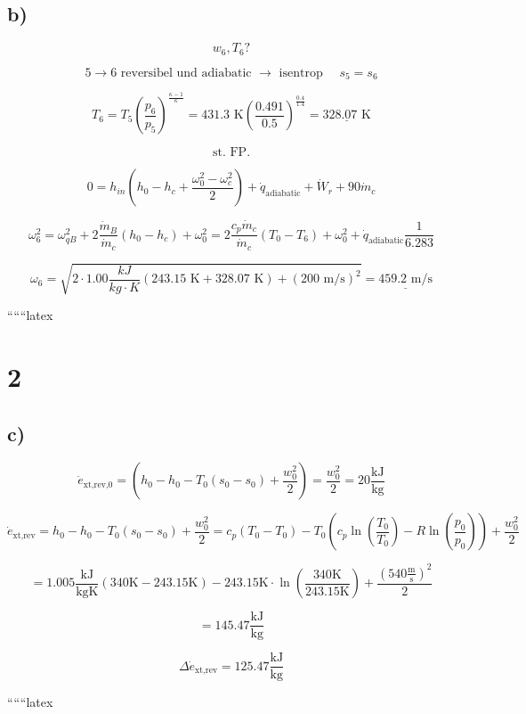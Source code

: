 \subsection*{b)}

\[
w_6, T_6 ?
\]

\[
5 \rightarrow 6 \text{ reversibel und adiabatic } \rightarrow \text{ isentrop } \quad s_5 = s_6
\]

\[
T_6 = T_5 \left( \frac{p_6}{p_5} \right)^{\frac{\kappa - 1}{\kappa}} = 431.3 \text{ K} \left( \frac{0.491}{0.5} \right)^{\frac{0.4}{1.4}} = \underline{328.07 \text{ K}}
\]

\[
\text{st. FP.}
\]

\[
0 = h_{in} \left( h_0 - h_c + \frac{\omega_0^2 - \omega_c^2}{2} \right) + \dot{q}_{\text{adiabatic}} + \dot{W}_r + 90 \dot{m}_c
\]

\[
\omega_6^2 = \omega_{qB}^2 + 2 \frac{\dot{m}_B}{\dot{m}_c} (h_0 - h_c) + \omega_0^2 = 2 \frac{c_p \dot{m}_c}{\dot{m}_c} (T_0 - T_6) + \omega_0^2 + \dot{q}_{\text{adiabatic}} \frac{1}{6.283}
\]

\[
\omega_6 = \sqrt{2 \cdot 1.00 \frac{kJ}{kg \cdot K} (243.15 \text{ K} + 328.07 \text{ K}) + (200 \text{ m/s})^2} = \underline{459.2 \text{ m/s}}
\]

``````latex

\section*{2}
\subsection*{c)}

\[
\dot{e}_{\text{xt,rev,0}} = (h_0 - h_0 - T_0 (s_0 - s_0) + \frac{w_0^2}{2}) = \frac{w_0^2}{2} = 20 \frac{\text{kJ}}{\text{kg}}
\]

\[
\dot{e}_{\text{xt,rev}} = h_0 - h_0 - T_0 (s_0 - s_0) + \frac{w_0^2}{2} = c_p (T_0 - T_0) - T_0 (c_p \ln \left(\frac{T_0}{T_0}\right) - R \ln \left(\frac{p_0}{p_0}\right)) + \frac{w_0^2}{2}
\]

\[
= 1.005 \frac{\text{kJ}}{\text{kgK}} (340 \text{K} - 243.15 \text{K}) - 243.15 \text{K} \cdot \ln \left(\frac{340 \text{K}}{243.15 \text{K}}\right) + \frac{(540 \frac{\text{m}}{\text{s}})^2}{2}
\]

\[
= 145.47 \frac{\text{kJ}}{\text{kg}}
\]

\[
\Delta \dot{e}_{\text{xt,rev}} = 125.47 \frac{\text{kJ}}{\text{kg}}
\]

``````latex


